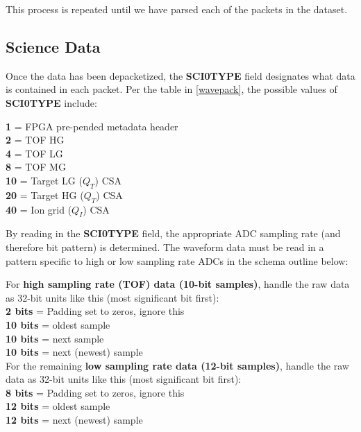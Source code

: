 This process is repeated until we have parsed each of the packets in the dataset.

\subsection{Science Data}
Once the data has been depacketized, the \textbf{SCI0TYPE} field designates what data is contained in each packet. Per the table in \ref{wavepack}, the possible values of \textbf{SCI0TYPE} include:
\begin{mdframed}[backgroundcolor=backcolour]{
 {\bf 1} = FPGA pre-pended metadata header \\
 {\bf 2} = TOF HG \\
 {\bf 4} = TOF LG \\
 {\bf 8} = TOF MG \\
 {\bf 10} = Target LG ($Q_T$) CSA \\
 {\bf 20} = Target HG ($Q_T$) CSA \\
 {\bf 40} = Ion grid ($Q_I$) CSA \\
} \end{mdframed}

By reading in the \textbf{SCI0TYPE} field, the appropriate ADC sampling rate (and therefore bit pattern) is determined.
\newpage 
The waveform data must be read in a pattern specific to high or low sampling rate ADCs in the schema outline below:

\begin{mdframed}[backgroundcolor=backcolour]{
\large For \textbf{high sampling rate (TOF) data (10-bit samples)}, handle the raw data as 32-bit units like this (most significant bit first):\newline 
\normalsize \\
  {\bf 2 bits} = Padding set to zeros, ignore this \\
  {\bf 10 bits} = oldest sample \\
  {\bf 10 bits} = next sample \\
  {\bf 10 bits} = next (newest) sample \\ 
\newline
\noindent \large For the remaining \textbf{low sampling rate data (12-bit samples)}, handle the raw data as 32-bit units like this (most significant bit first):\newline 
 \normalsize \\
  {\bf 8 bits} = Padding set to zeros, ignore this \\
  {\bf 12 bits} = oldest sample \\
  {\bf 12 bits} = next (newest) sample \\
} \end{mdframed}

